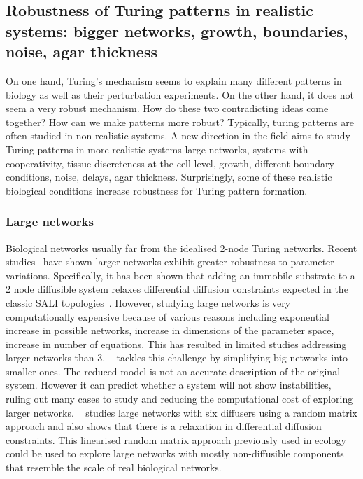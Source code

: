 \subsection{Robustness of Turing patterns in realistic systems: bigger networks, growth, boundaries, noise, agar thickness}
On one hand, Turing's mechanism seems to explain many different patterns in biology as well as their perturbation experiments.
On the other hand, it does not seem a very robust mechanism.
How do these two contradicting ideas come together?
How can we make patterns more robust?
Typically, turing patterns are often studied in non-realistic systems.
A new direction in the field aims to study Turing patterns in more realistic systems large networks, systems with cooperativity, tissue discreteness at the cell level, growth, different boundary conditions, noise, delays, agar thickness.
Surprisingly, some of these realistic biological conditions increase robustness for Turing pattern formation. %

\subsubsection{Large networks}
Biological networks usually far from the idealised 2-node Turing networks. %
Recent studies~\parencite{Zheng2016, Scholes2019, Marcon} have shown larger networks exhibit greater robustness to parameter variations.
Specifically, it has been shown that adding an immobile substrate to a 2 node diffusible system relaxes differential diffusion constraints expected in the classic SALI topologies~\parencite{korvasova2015}.
However, studying large networks is very computationally expensive because of various reasons including exponential increase in possible networks, increase in dimensions of the parameter space, increase in number of equations.
This has resulted in limited studies addressing larger networks than 3.
~\cite{Smith2018a} tackles this challenge by simplifying big networks into smaller ones.
The reduced model is not an accurate description of the original system.
However it can predict whether a system will not show instabilities, ruling out many cases to study and reducing the computational cost of exploring larger networks.
~\cite{Haas2021} studies large networks with six diffusers using a random matrix approach and also shows that there is a relaxation in differential diffusion constraints.
This linearised random matrix approach previously used in ecology~\parencite{May1972} could be used to explore large networks with mostly non-diffusible components that resemble the scale of real biological networks. %

